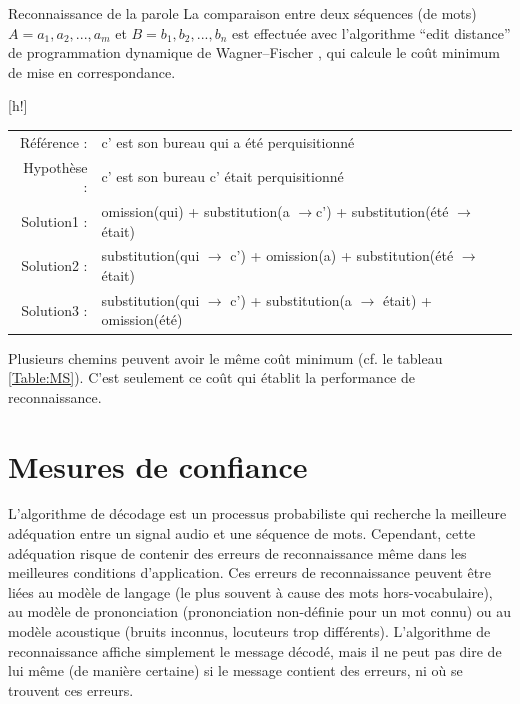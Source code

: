 \documentclass{style/these}
\makeatletter
\renewcommand\familydefault{ptm}
\renewenvironment{table}%
{ \renewcommand{\familydefault}{ptm}\selectfont
  \@float{table}}
  {\end@float}
\let\oldcite=\cite
\renewcommand{\cite}[1]{{\fontfamily{qcs}\selectfont{\color{darkerblue}[\oldcite{#1}]}}}
\makeatother
\begin{document}
\begin{part}{Reconnaissance de la parole}
La comparaison entre deux séquences (de mots) $A=a_1,a_2,...,a_m$ et $B=b_1,b_2,...,b_n$ est effectuée avec l'algorithme ``edit distance'' de programmation dynamique de Wagner–Fischer \cite{Wagner:1974}, qui calcule le coût minimum de mise en correspondance.

\begin{table}[h!]
\centering
\begin{tabular}{|rl|}
\hline
Référence :	& c' est son bureau qui a été perquisitionné 						\\
Hypothèse :	& c' est son bureau c' était perquisitionné 						\\ \hline
Solution1 :	& {\color{darkgreen} omission}(qui) + {\color{blue}substitution}(a $\rightarrow $c') + {\color{blue}substitution}(été $\rightarrow$ était)	\\
Solution2 :	& {\color{blue}substitution}(qui $\rightarrow$ c') + {\color{darkgreen} omission}(a) + {\color{blue}substitution}(été $\rightarrow$ était)	\\
Solution3 :	& {\color{blue}substitution}(qui $\rightarrow$ c') + {\color{blue}substitution}(a $\rightarrow$ était) + {\color{darkgreen} omission}(été)	\\
\hline
\end{tabular}
\caption{Solutions multiples pour la mise en correspondance d'une hypothèse de reconnaissance avec la transcription de référence}
\label{Table:MS}
\end{table}

Plusieurs chemins peuvent avoir le même coût minimum (cf. le tableau \ref{Table:MS}). 
C'est seulement ce coût qui établit la performance de reconnaissance. 


\section{Mesures de confiance}
\renewcommand{\rightmark}{Mesures de confiance}

L'algorithme de décodage est un processus probabiliste qui recherche la meilleure adéquation entre un signal audio et une séquence de mots. Cependant, cette adéquation risque de contenir des erreurs de reconnaissance même dans les meilleures conditions d'application. Ces erreurs de reconnaissance peuvent être liées au modèle de langage (le plus souvent à cause des mots hors-vocabulaire), au modèle de prononciation (prononciation non-définie pour un mot connu) ou au modèle acoustique (bruits inconnus, locuteurs trop différents). L'algorithme de reconnaissance affiche simplement le message décodé, mais il ne peut pas dire de lui même (de manière certaine) si le message contient des erreurs, ni où se trouvent ces erreurs. 


\end{part}
\end{document}
